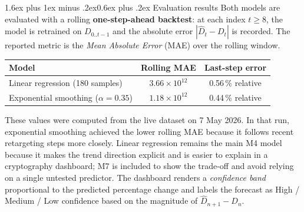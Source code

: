\documentclass[11pt,a4paper]{article}
\makeatletter
\renewcommand{\subsection}{\@startsection{subsection}{2}{0pt}%
  {1.6ex plus 1ex minus .2ex}{0.6ex plus .2ex}%
  {\color{btcgreensoft!60!black}\normalsize\bfseries\sffamily}}
\makeatother
\begin{document}
\begin{center}
\end{center}

\subsection{Evaluation results}
Both models are evaluated with a rolling \textbf{one-step-ahead backtest}: at
each index $t \geq 8$, the model is retrained on $D_{0..t-1}$ and the
absolute error $|\hat{D}_t - D_t|$ is recorded. The reported metric is the
\emph{Mean Absolute Error} (MAE) over the rolling window.

\begin{center}
\renewcommand{\arraystretch}{1.25}
\begin{tabular}{@{}lcc@{}}
\toprule
\textbf{Model} & \textbf{Rolling MAE} & \textbf{Last-step error} \\
\midrule
Linear regression (180 samples)        & $3.66 \times 10^{12}$ & 0.56\,\% relative \\
Exponential smoothing ($\alpha{=}0.35$) & $1.18 \times 10^{12}$ & 0.44\,\% relative \\
\bottomrule
\end{tabular}
\end{center}

These values were computed from the live dataset on 7 May 2026. In that run,
exponential smoothing achieved the lower rolling MAE because it follows recent
retargeting steps more closely. Linear regression remains the main M4 model
because it makes the trend direction explicit and is easier to explain in a
cryptography dashboard; M7 is included to show the trade-off and avoid relying
on a single untested predictor. The dashboard renders a \emph{confidence band}
proportional to the predicted percentage change and labels the forecast as
High / Medium / Low confidence based on the magnitude of
$\hat{D}_{n+1} - D_n$.
\end{document}
